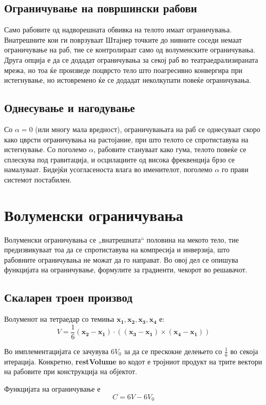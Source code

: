\subsection{Ограничување на површински рабови}

Само рабовите од надворешната обвивка на телото имаат ограничувања. Внатрешните кои ги поврзуваат Штајнер точките до нивните соседи немаат ограничување на раб, тие се контролираат само од волуменските ограничувања. Друга опција е да се додадат ограничувања за секој раб во театраедрализираната мрежа, но тоа ќе произведе поцврсто тело што поагресивно конвергира при истегнување, но истовремено ќе се додадат неколкупати повеќе ограничувања.

\subsection{Однесување и нагодување}
Со $\alpha = 0 $ (или многу мала вредност), ограничувањата на раб се однесуваат скоро како цврсти ограничувања на растојание, при што телото се спротиставува на истегнување. Со поголемо $\alpha$, рабовите стануваат како гума, телото повеќе се сплескува под гравитација, и осцилациите од висока фреквенција брзо се намалуваат. Бидејќи усогласеноста влага во именителот, поголемо $\alpha$ го прави системот постабилен.


\section{Волуменски ограничувања}
Волуменски ограничувања се „внатрешната“ половина на мекото тело, тие предизвикуваат тоа да се спротиставува на компресија и инверзија, што рабовните ограничувања не можат да го направат. Во овој дел се опишува функцијата на ограничување, формулите за  градиенти, чекорот во решавачот.

\subsection{Скаларен троен производ}
Волуменот на тетраедар со темиња $\mathbf{x_1, x_2, x_3, x_4}$ е:
$$V = \frac{1}{6}\mathbf{(x_2 - x_1)}\cdot((\mathbf{x_3 - x_1})\times\mathbf{(x_4 - x_1)})$$

Во имплементацијата се зачувува $6V_0$ за да се прескокне делењето со $\frac{1}{6}$ во секоја итерација. Конкретно, \textbf{restVolume} во кодот е тројниот продукт на трите вектори на рабовите при конструкција на објектот.

Функцијата на ограничување е 
$$ C = 6V - 6V_0$$

